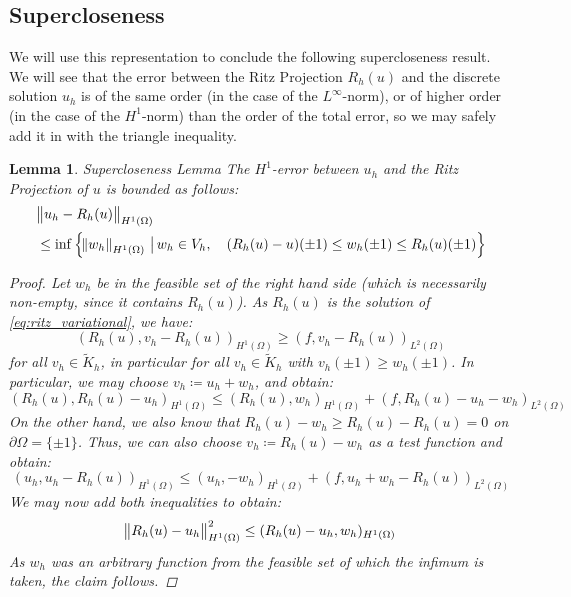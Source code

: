 \documentclass[headsepline,footsepline,footinclude=false,oneside,fontsize=11pt,paper=a4,listof=totoc,bibliography=totoc]{scrbook} %
\newtheorem{lemma}{Lemma}
\begin{document}
\subsection{Supercloseness}

We will use this representation to conclude the following supercloseness result. We will see that the error between the Ritz Projection $R_h(u)$ and the discrete solution $u_h$ is of the same order (in the case of the $L^\infty$-norm), or of higher order (in the case of the $H^1$-norm) than the order of the total error, so we may safely add it in with the triangle inequality.

\begin{lemma} Supercloseness Lemma \newline
	The $H^1$-error between $u_h$ and the Ritz Projection of $u$ is bounded as follows:
	\begin{align} \label{eq:supercloseness_lemma}
	\begin{split}
	&\norm{u_h - R_h(u)}_{H^1(\Omega)} \\ &\leq \inf \left\{
	\norm{w_h}_{H^1(\Omega)} \,\big|\, w_h \in V_h, \quad (R_h(u) - u)(\pm 1) \leq w_h(\pm 1) \leq R_h(u)(\pm 1)
	\right\}
	\end{split}
	\end{align}
	\begin{proof}
		Let $w_h$ be in the feasible set of the right hand side (which is necessarily non-empty, since it contains $R_h(u)$). As $R_h(u)$ is the solution of \eqref{eq:ritz_variational}, we have:
		\begin{equation*}
		(R_h(u), v_h - R_h(u))_{H^1(\Omega)} \geq (f, v_h - R_h(u))_{L^2(\Omega)}
		\end{equation*}
		for all $v_h \in \tilde{K}_h$, in particular for all $v_h \in \tilde{K}_h$ with $v_h(\pm 1) \geq w_h(\pm 1)$. In particular, we may choose $v_h \coloneqq u_h + w_h$, and obtain:
		\begin{equation*}
		(R_h(u), R_h(u)-u_h)_{H^1(\Omega)} \leq (R_h(u),w_h)_{H^1(\Omega)} + (f,R_h(u)-u_h-w_h)_{L^2(\Omega)}
		\end{equation*}
		On the other hand, we also know that $R_h(u)-w_h \geq R_h(u) - R_h(u) = 0$ on $\partial\Omega = \{\pm 1\}$. Thus, we can also choose $v_h \coloneqq R_h(u) - w_h$ as a test function and obtain:
		\begin{equation*}
		(u_h, u_h-R_h(u))_{H^1(\Omega)} \leq (u_h,-w_h)_{H^1(\Omega)} + (f,u_h + w_h - R_h(u))_{L^2(\Omega)}
		\end{equation*}		
		We may now add both inequalities to obtain:
		\begin{equation*}
		\norm{R_h(u)-u_h}^2_{H^1(\Omega)} \leq (R_h(u)-u_h, w_h)_{H^1(\Omega)}
		\end{equation*}
		As $w_h$ was an arbitrary function from the feasible set of which the infimum is taken, the claim follows.
	\end{proof}
\end{lemma}
\end{document}
